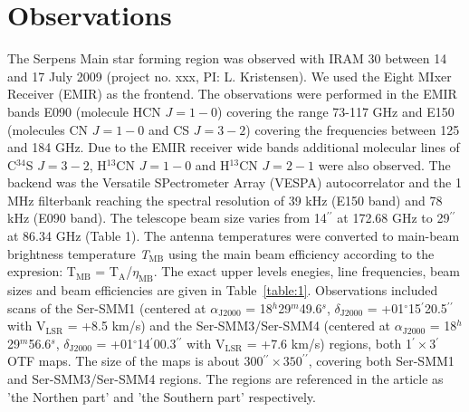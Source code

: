 \documentclass{aa}
\begin{document}
\section{Observations}
The Serpens Main star forming region was observed with IRAM 30 between 14 and 17 July 2009 (project no. xxx, PI: L. Kristensen). We used the Eight MIxer Receiver (EMIR) as the frontend. The observations were performed in the EMIR bands E090 (molecule HCN $J=1-0$) covering the range 73-117 GHz and E150 (molecules CN $J=1-0$ and CS $J=3-2$) covering the frequencies between 125 and 184 GHz. Due to the EMIR receiver wide bands additional molecular lines of C$^{34}$S $J=3-2$, H$^{13}$CN $J=1-0$ and H$^{13}$CN $J=2-1$ were also observed. The backend was the Versatile SPectrometer Array (VESPA) autocorrelator and the 1 MHz filterbank reaching the spectral resolution of 39 kHz (E150 band) and 78 kHz (E090 band). The telescope beam size varies from 14$^{\prime\prime}$ at 172.68 GHz to 29$^{\prime\prime}$ at 86.34 GHz (Table 1). The antenna temperatures were converted to main-beam brightness temperature \textit{T$_\mathrm{MB}$} using the main beam efficiency according to the expresion: T$_\mathrm{MB}$ = T$_\mathrm{A}$/$\eta_\mathrm{MB}$. The exact upper levels enegies, line frequencies, beam sizes and beam efficiencies are given in Table~\ref{table:1}. Observations included scans of the Ser-SMM1 (centered at $\alpha_\mathrm{J2000}$ = 18$^h$29$^m$49.6$^s$, $\delta_\mathrm{J2000}$ = +01$^{\circ}$15$^{\prime}$20.5$^{\prime\prime}$ with V$_\mathrm{LSR}$ = +8.5 km/s) and the Ser-SMM3/Ser-SMM4 (centered at $\alpha_\mathrm{J2000}$ = 18$^h$29$^m$56.6$^s$, $\delta_\mathrm{J2000}$ = +01$^{\circ}$14$^{\prime}$00.3$^{\prime\prime}$ with V$_\mathrm{LSR}$ = +7.6 km/s) regions, both 1$^{\prime}\times$3$^{\prime}$ OTF maps. The size of the maps is about 300$^{\prime\prime}\times350^{\prime\prime}$, covering both Ser-SMM1 and Ser-SMM3/Ser-SMM4 regions. The regions are referenced in the article as 'the Northen part' and 'the Southern part' respectively. 
\end{document}
